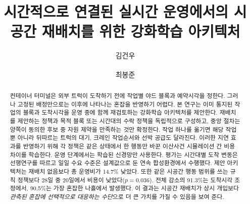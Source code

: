 \documentclass{llncs}
\begin{document}
\raggedbottom

\title{시간적으로 연결된 실시간 운영에서의 시공간 재배치를 위한
강화학습 아키텍처}

\author{김건우 \and 최봉준\textsuperscript{\Letter}}

\maketitle

\begin{abstract}
컨테이너 터미널은 외부 트럭이 도착하기 전에 작업별 야드 블록과 예약시각을 정한다.
그러나 고정된 배정만으로는 이후에 나타나는 혼잡을 반영하기 어렵다. 본 연구는 이미
통지된 작업의 블록과 도착시각을 운영 중에 함께 재검토하는 강화학습 아키텍처를
제안한다. 재배치를 제안하는 정책과 목적 블록 또는 시간대의 수락 정책을 독립적으로
구성하고, 중앙 절차는 양쪽이 동의한 후보 중 자원 제약을 만족하는 것만 확정한다.
작업 하나를 옮기면 해당 작업뿐 아니라 뒤따르는 트럭의 대기, 크레인 작업순서와 선박
공급도 달라진다. 이러한 지연 효과를 반영하기 위해 각 정책은 같은 상태에서 한 행동만
바꾼 이산사건 시뮬레이션 간 비용 차이를 학습한다. 운영 단계에서는 학습된 신경망만
사용한다. 평가는 시간대별 도착 변동은 선행연구를 따르고 일일 수요 수준은 설계값으로 둔 연속
합성환경에서 수행했다. 제안 아키텍처는 재배치 없음보다 총 운영비가 14.7\% 낮았다. 또한 같은 시공간
행동 범위를 쓰는 규칙 정책보다 28일 중 20일에서 비용이 낮았다($p=0.036$). 전체 감소의
91.3\%는 도착시각 조정에서, 90.5\%는 가장 혼잡한 나흘에서 발생했다. 이 결과는 시공간
재배치가 상시 개입보다 \emph{관측된 혼잡에 선택적으로 대응하는 수단}으로 더 큰 가치를
가질 수 있음을 보여 준다.

\end{abstract}
\end{document}
